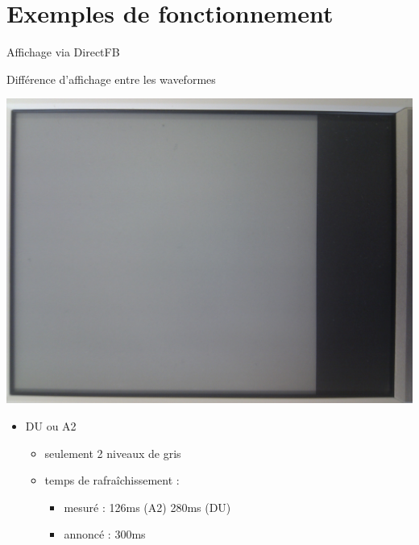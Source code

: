 \section[Exemples]{Exemples de fonctionnement}

\begin{frame}{ Affichage via DirectFB }
	\begin{block} { Différence d'affichage entre les waveformes }
		\parbox{0.3\linewidth}{
			\includegraphics[angle=-90,origin=c,scale=0.04]{du_a2.jpg}
		}
		\parbox{0.6\linewidth}{
			\begin{itemize}
				\item DU ou A2
				\begin{itemize}
					\item seulement 2 niveaux de gris
					\item temps de rafraîchissement : 
					\begin{itemize}
						\item mesuré  : 126ms (A2) 280ms (DU)
						\item annoncé  : 300ms
					\end{itemize}		
				\end{itemize}
			\end{itemize}
		}
	\end{block}
\end{frame}

